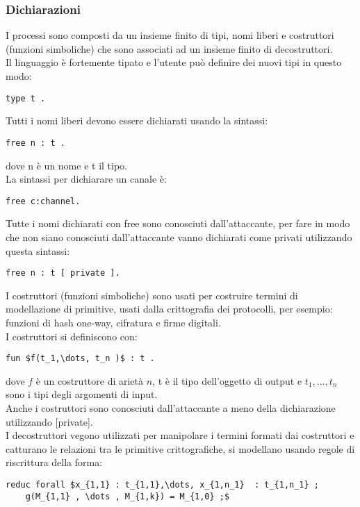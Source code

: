 \subsubsection*{Dichiarazioni}
I processi sono composti da un insieme finito di tipi, nomi liberi e costruttori (funzioni simboliche) che
sono associati ad un insieme finito di decostruttori.\\ 
Il linguaggio è fortemente tipato e l'utente può definire dei nuovi tipi in questo modo: 
\begin{lstlisting}[language=app]
    type t . 
\end{lstlisting}
Tutti i nomi liberi devono essere dichiarati usando la sintassi: 
\begin{lstlisting}[language=app]
    free n : t .
\end{lstlisting} 
dove n è un nome e t il tipo.\\
La sintassi per dichiarare un canale è: 
\begin{lstlisting}[language=app]
    free c:channel.   
\end{lstlisting}
Tutte i nomi dichiarati con free sono conosciuti dall'attaccante, per fare in modo che non siano conosciuti dall'attaccante vanno dichiarati come privati utilizzando questa sintassi: 
\begin{lstlisting}[language=app]
    free n : t [ private ]. 
\end{lstlisting}
I costruttori (funzioni simboliche) sono usati per costruire termini di modellazione di primitive, usati dalla crittografia dei
protocolli, per esempio: funzioni di hash one-way, cifratura e firme digitali.\\
I costruttori si definiscono con:
\begin{lstlisting}[language=app, mathescape]
    fun $f(t_1,\dots, t_n )$ : t . 
\end{lstlisting} 
dove $f$ è un costruttore di arietà $n$, t è il tipo dell'oggetto di output e $t_1,\dots, t_n $ sono i tipi degli argomenti di input.\\
Anche i costruttori sono conosciuti dall'attaccante a meno della dichiarazione utilizzando [private].\\
I decostruttori vegono utilizzati per manipolare i termini formati dai costruttori e catturano le relazioni tra le primitive crittografiche, si modellano usando regole di riscrittura della forma:
\begin{lstlisting}[language=app, mathescape, breaklines= true]
    reduc forall $x_{1,1} : t_{1,1},\dots, x_{1,n_1}  : t_{1,n_1} ; 
    g(M_{1,1} , \dots , M_{1,k}) = M_{1,0} ;$
\end{lstlisting} 
